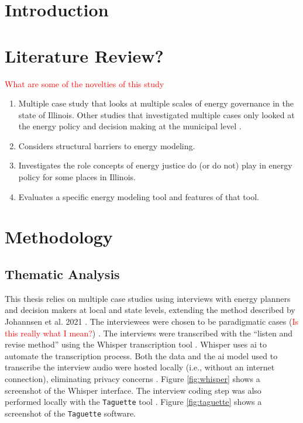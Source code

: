 \section{Introduction}



\section{Literature Review?}

\textcolor{red}{What are some of the novelties of this study}
\begin{enumerate}
    \item Multiple case study that looks at multiple scales of energy governance in the state of Illinois.
    Other studies that investigated multiple cases only looked at the energy policy and decision making at
    the municipal level \cite{johannsen_designing_2021, ben_amer_too_2020}.
    \item Considers structural barriers to energy modeling.
    \item Investigates the role concepts of energy justice do (or do not) play in energy policy for some 
    places in Illinois.
    \item Evaluates a specific energy modeling tool and features of that tool.
\end{enumerate}

\section{Methodology}

\subsection{Thematic Analysis}
This thesis relies on multiple case studies using interviews with energy planners and decision makers at local
and state levels, extending the method described by Johannsen et al. 2021 \cite{johannsen_designing_2021}. The
interviewees were chosen to be paradigmatic cases (\textcolor{red}{Is this really what I mean?}) \cite{flyvbjerg_five_2006}.
The interviews were transcribed with the ``listen and revise method'' using the Whisper transcription tool \cite{battaglia_listen_2024}. Whisper uses \ac{ai} to automate the transcription
process. Both the data and the \ac{ai} model used to transcribe the interview audio were hosted locally (i.e., without an internet
connection), eliminating privacy concerns \cite{battaglia_listen_2024}. Figure \ref{fig:whisper} shows a screenshot of the 
Whisper interface. The interview coding step was also performed locally with
the \texttt{Taguette} tool \cite{rampin_taguette_2021}. Figure \ref{fig:taguette} shows a screenshot of the \texttt{Taguette}
software.

